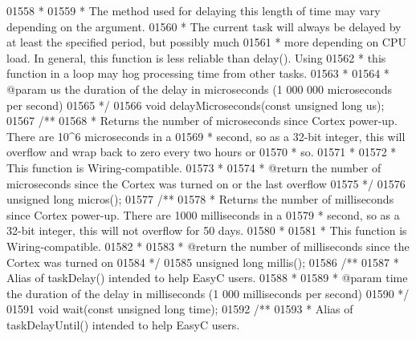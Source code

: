 \begin{DoxyCode}
{{{{{{{{{01558 \textcolor{comment}{ *}
01559 \textcolor{comment}{ * The method used for delaying this length of time may vary depending on the argument.}
01560 \textcolor{comment}{ * The current task will always be delayed by at least the specified period, but possibly much}
01561 \textcolor{comment}{ * more depending on CPU load. In general, this function is less reliable than delay(). Using}
01562 \textcolor{comment}{ * this function in a loop may hog processing time from other tasks.}
01563 \textcolor{comment}{ *}
01564 \textcolor{comment}{ * @param us the duration of the delay in microseconds (1 000 000 microseconds per second)}
01565 \textcolor{comment}{ */}
01566 \textcolor{keywordtype}{void} delayMicroseconds(\textcolor{keyword}{const} \textcolor{keywordtype}{unsigned} \textcolor{keywordtype}{long} us);
01567 \textcolor{comment}{/**}
01568 \textcolor{comment}{ * Returns the number of microseconds since Cortex power-up. There are 10^6 microseconds in a}
01569 \textcolor{comment}{ * second, so as a 32-bit integer, this will overflow and wrap back to zero every two hours or}
01570 \textcolor{comment}{ * so.}
01571 \textcolor{comment}{ *}
01572 \textcolor{comment}{ * This function is Wiring-compatible.}
01573 \textcolor{comment}{ *}
01574 \textcolor{comment}{ * @return the number of microseconds since the Cortex was turned on or the last overflow}
01575 \textcolor{comment}{ */}
01576 \textcolor{keywordtype}{unsigned} \textcolor{keywordtype}{long} micros();
01577 \textcolor{comment}{/**}
01578 \textcolor{comment}{ * Returns the number of milliseconds since Cortex power-up. There are 1000 milliseconds in a}
01579 \textcolor{comment}{ * second, so as a 32-bit integer, this will not overflow for 50 days.}
01580 \textcolor{comment}{ *}
01581 \textcolor{comment}{ * This function is Wiring-compatible.}
01582 \textcolor{comment}{ *}
01583 \textcolor{comment}{ * @return the number of milliseconds since the Cortex was turned on}
01584 \textcolor{comment}{ */}
01585 \textcolor{keywordtype}{unsigned} \textcolor{keywordtype}{long} millis();
01586 \textcolor{comment}{/**}
01587 \textcolor{comment}{ * Alias of taskDelay() intended to help EasyC users.}
01588 \textcolor{comment}{ *}
01589 \textcolor{comment}{ * @param time the duration of the delay in milliseconds (1 000 milliseconds per second)}
01590 \textcolor{comment}{ */}
01591 \textcolor{keywordtype}{void} wait(\textcolor{keyword}{const} \textcolor{keywordtype}{unsigned} \textcolor{keywordtype}{long} time);
01592 \textcolor{comment}{/**}
01593 \textcolor{comment}{ * Alias of taskDelayUntil() intended to help EasyC users.}
}}}}}}}}}
\end{DoxyCode}
